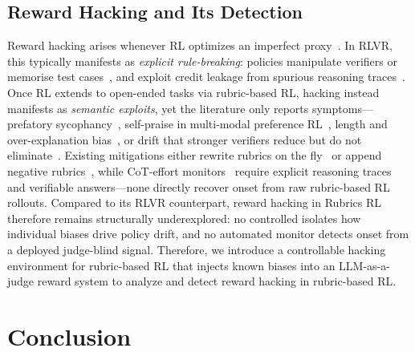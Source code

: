 \documentclass{llmxive}
\begin{document}
\subsection{Reward Hacking and Its Detection}

Reward hacking arises whenever RL optimizes an imperfect proxy~\citep{wangRewardHackingEra2026, skalse2025definingcharacterizingrewardhacking, eisensteinHelpingHerdingReward2024}. In RLVR, this typically manifests as \emph{explicit rule-breaking}: policies manipulate verifiers or memorise test cases~\citep{khalifaCountdownCodeTestbedStudying2026, zhaoOneTokenFool2025}, and exploit credit leakage from spurious reasoning traces~\citep{cuiProcessReinforcementImplicit2025, zhaRLTangoReinforcing2025}. Once RL extends to open-ended tasks via rubric-based RL, hacking instead manifests as \emph{semantic exploits}, yet the literature only reports symptoms—prefatory sycophancy~\citep{huangReinforcementLearningRubric2025}, self-praise in multi-modal preference RL~\citep{zhouGenerativeRLHFV2025}, length and over-explanation bias~\citep{jiaWritingZeroBridgeGap2025}, or drift that stronger verifiers reduce but do not eliminate~\citep{mahmoudRewardHackingRubricBased2026}. Existing mitigations either rewrite rubrics on the fly~\citep{rezaeiOnlineRubricsElicitation2025} or append negative rubrics~\citep{shaoDRTuluReinforcement2025}, while CoT-effort monitors~\citep{wangItThinkingCheating2026, guanMonitoringMonitorability2025} require explicit reasoning traces and verifiable answers—none directly recover onset from raw rubric-based RL rollouts. Compared to its RLVR counterpart, reward hacking in Rubrics RL therefore remains structurally underexplored: no controlled isolates how individual biases drive policy drift, and no automated monitor detects onset from a deployed judge-blind signal. Therefore, we introduce a controllable hacking environment for rubric-based RL that injects known biases into an LLM-as-a-judge reward system to analyze and detect reward hacking in rubric-based RL.





\section{Conclusion}
\label{sec:conclusion}
\end{document}
